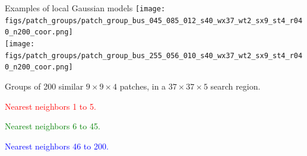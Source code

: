 \documentclass[mathserif, 8pt]{beamer}
\begin{document}
\begin{frame}{Examples of local Gaussian models}
	\centering
	\texttt{[image: figs/patch\_groups/patch\_group\_bus\_045\_085\_012\_s40\_wx37\_wt2\_sx9\_st4\_r040\_n200\_coor.png]}\\
	\vspace{.2cm}
	\texttt{[image: figs/patch\_groups/patch\_group\_bus\_255\_056\_010\_s40\_wx37\_wt2\_sx9\_st4\_r040\_n200\_coor.png]}

	\bigskip

	Groups of 200 similar $9\times 9\times 4$ patches, in a $37\times37\times5$ search region. 

	\bigskip

	\textcolor{red}{Nearest neighbors 1 to 5.}

	\textcolor{green}{Nearest neighbors 6 to 45.}

	\textcolor{blue}{Nearest neighbors 46 to 200.}

\end{frame}
\end{document}
